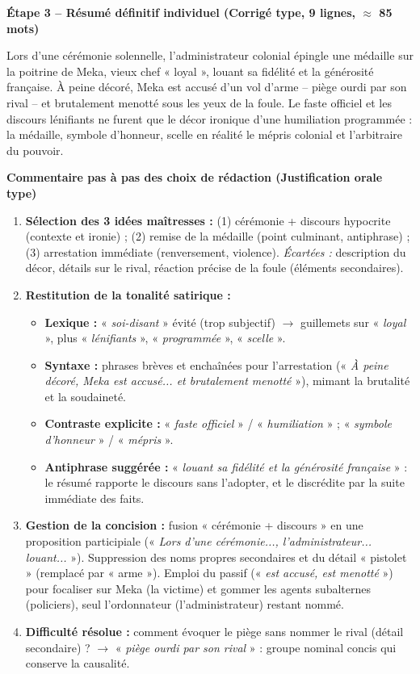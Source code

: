 \documentclass[11pt]{article}
\newcommand{\cle}[1]{{\popxbold\color{popdark}#1}}
\begin{document}
\begin{exoresolu}
\textbf{Étape 3 -- Résumé définitif individuel (Corrigé type, 9 lignes, $\approx$ 85 mots)}

Lors d'une cérémonie solennelle, l'administrateur colonial épingle une médaille sur la poitrine de Meka, vieux chef « loyal », louant sa fidélité et la générosité française. À peine décoré, Meka est accusé d'un vol d'arme -- piège ourdi par son rival -- et brutalement menotté sous les yeux de la foule. Le faste officiel et les discours lénifiants ne furent que le décor ironique d'une humiliation programmée : la médaille, symbole d'honneur, scelle en réalité le mépris colonial et l'arbitraire du pouvoir.

\tcblower

\textbf{Commentaire pas à pas des choix de rédaction (Justification orale type)}

\begin{enumerate}
    \item \textbf{Sélection des 3 idées maîtresses :} (1) cérémonie + discours hypocrite (contexte et ironie) ; (2) remise de la médaille (point culminant, antiphrase) ; (3) arrestation immédiate (renversement, violence). \emph{Écartées :} description du décor, détails sur le rival, réaction précise de la foule (éléments secondaires).
    \item \textbf{Restitution de la tonalité satirique :}
    \begin{itemize}
        \item \textbf{Lexique :} « \emph{soi-disant} » évité (trop subjectif) $\rightarrow$ guillemets sur « \emph{loyal} », plus « \emph{lénifiants} », « \emph{programmée} », « \emph{scelle} ».
        \item \textbf{Syntaxe :} phrases brèves et enchaînées pour l'arrestation (« \emph{À peine décoré, Meka est accusé... et brutalement menotté} »), mimant la brutalité et la soudaineté.
        \item \textbf{Contraste explicite :} « \emph{faste officiel} » / « \emph{humiliation} » ; « \emph{symbole d'honneur} » / « \emph{mépris} ».
        \item \textbf{Antiphrase suggérée :} « \emph{louant sa fidélité et la générosité française} » : le résumé rapporte le discours sans l'adopter, et le discrédite par la suite immédiate des faits.
    \end{itemize}
    \item \textbf{Gestion de la concision :} fusion « cérémonie + discours » en une proposition participiale (« \emph{Lors d'une cérémonie..., l'administrateur... louant...} »). Suppression des noms propres secondaires et du détail « pistolet » (remplacé par « arme »). Emploi du \cle{passif} (« \emph{est accusé, est menotté} ») pour focaliser sur Meka (la victime) et gommer les agents subalternes (policiers), seul l'ordonnateur (l'administrateur) restant nommé.
    \item \textbf{Difficulté résolue :} comment évoquer le piège sans nommer le rival (détail secondaire) ? $\rightarrow$ « \emph{piège ourdi par son rival} » : groupe nominal concis qui conserve la causalité.
\end{enumerate}


\end{exoresolu}
\end{document}
